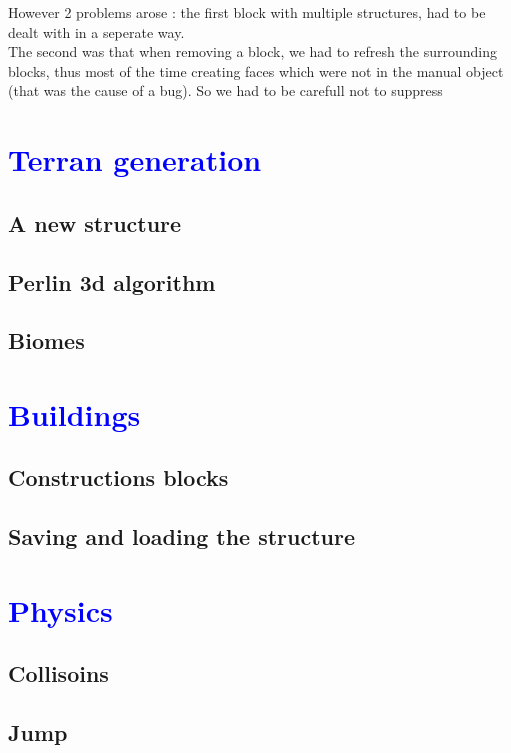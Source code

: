 \documentclass[article]{report}             %
\begin{document}
However 2 problems arose : the first block with multiple structures, had to be dealt with in a seperate way. \\
The second was that when removing a block, we had to refresh the surrounding blocks, thus most of the time creating faces which were not in the manual object (that was the cause of a bug). So we had to be carefull not to suppress 

		\chapter{\textcolor{blue}{Terran generation}}
			\section{A new structure}
				
			\section{Perlin 3d algorithm}
				
			\section{Biomes}
			
		\chapter{\textcolor{blue}{Buildings}}
			\section{Constructions blocks}
			
			\section{Saving and loading the structure}
			
		\chapter{\textcolor{blue}{Physics}}
			\section{Collisoins}
				
			\section{Jump}
				
\end{document}
